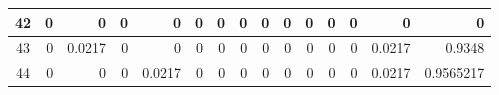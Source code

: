 \begin{table}[hb!]
\begin{adjustbox}{width = \textwidth, center}
\begin{tabular}{|c|r|r|r|r|r|r|r|r|r|r|r|r|r|r|}
        \rowcolor[HTML]{FFFFFF} 
        \cellcolor[HTML]{CFE2F3}42                                  & 0                                              & 0                                              & 0                                              & 0                                              & 0                                              & 0                                              & 0                                              & 0                                               & 0                                               & 0                                               & 0                                               & 0                                               & \cellcolor[HTML]{D9D2E9}0                                                       & \cellcolor[HTML]{D9D2E9}0                                                             \\ \hline
        \rowcolor[HTML]{FFFFFF} 
        \cellcolor[HTML]{CFE2F3}43                                  & 0                                              & \cellcolor[HTML]{C7E9D8}0.0217                 & 0                                              & 0                                              & 0                                              & 0                                              & 0                                              & 0                                               & 0                                               & 0                                               & 0                                               & 0                                               & \cellcolor[HTML]{D9D2E9}0.0217                                                  & \cellcolor[HTML]{D9D2E9}0.9348                                                        \\ \hline
        \rowcolor[HTML]{FFFFFF} 
        \cellcolor[HTML]{CFE2F3}44                                  & 0                                              & 0                                              & 0                                              & \cellcolor[HTML]{C7E9D8}0.0217                 & 0                                              & 0                                              & 0                                              & 0                                               & 0                                               & 0                                               & 0                                               & 0                                               & \cellcolor[HTML]{D9D2E9}0.0217                                                  & \cellcolor[HTML]{D9D2E9}0.9565217                                                     \\ \hline

\end{tabular}
\end{adjustbox}
\end{table}

